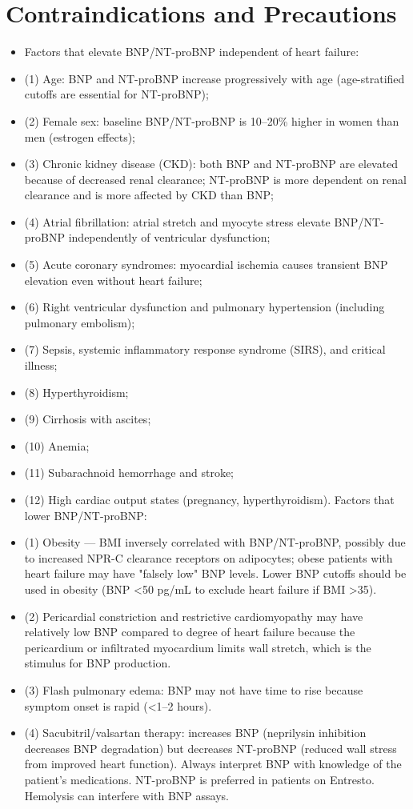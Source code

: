 \section*{Contraindications and Precautions}
\begin{itemize}
  \item Factors that elevate BNP/NT-proBNP independent of heart failure:
  \item (1) Age: BNP and NT-proBNP increase progressively with age (age-stratified cutoffs are essential for NT-proBNP);
  \item (2) Female sex: baseline BNP/NT-proBNP is 10--20\% higher in women than men (estrogen effects);
  \item (3) Chronic kidney disease (CKD): both BNP and NT-proBNP are elevated because of decreased renal clearance; NT-proBNP is more dependent on renal clearance and is more affected by CKD than BNP;
  \item (4) Atrial fibrillation: atrial stretch and myocyte stress elevate BNP/NT-proBNP independently of ventricular dysfunction;
  \item (5) Acute coronary syndromes: myocardial ischemia causes transient BNP elevation even without heart failure;
  \item (6) Right ventricular dysfunction and pulmonary hypertension (including pulmonary embolism);
  \item (7) Sepsis, systemic inflammatory response syndrome (SIRS), and critical illness;
  \item (8) Hyperthyroidism;
  \item (9) Cirrhosis with ascites;
  \item (10) Anemia;
  \item (11) Subarachnoid hemorrhage and stroke;
  \item (12) High cardiac output states (pregnancy, hyperthyroidism). Factors that lower BNP/NT-proBNP:
  \item (1) Obesity --- BMI inversely correlated with BNP/NT-proBNP, possibly due to increased NPR-C clearance receptors on adipocytes; obese patients with heart failure may have "falsely low" BNP levels. Lower BNP cutoffs should be used in obesity (BNP <50 pg/mL to exclude heart failure if BMI >35).
  \item (2) Pericardial constriction and restrictive cardiomyopathy may have relatively low BNP compared to degree of heart failure because the pericardium or infiltrated myocardium limits wall stretch, which is the stimulus for BNP production.
  \item (3) Flash pulmonary edema: BNP may not have time to rise because symptom onset is rapid (<1--2 hours).
  \item (4) Sacubitril/valsartan therapy: increases BNP (neprilysin inhibition decreases BNP degradation) but decreases NT-proBNP (reduced wall stress from improved heart function). Always interpret BNP with knowledge of the patient's medications. NT-proBNP is preferred in patients on Entresto. Hemolysis can interfere with BNP assays.
\end{itemize}
